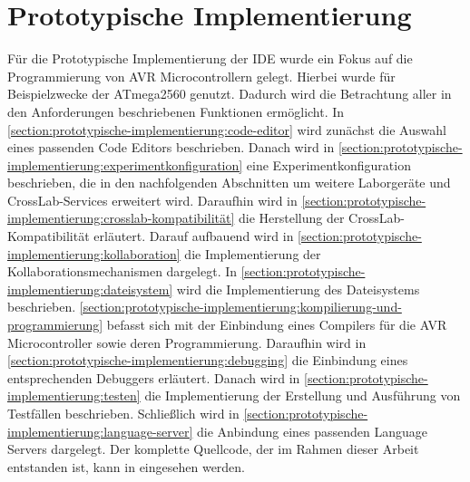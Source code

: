 \chapter{Prototypische Implementierung}\label{section:prototypische-implementierung}

Für die Prototypische Implementierung der IDE wurde ein Fokus auf die Programmierung von AVR Microcontrollern \cite{noauthor_avr_nodate} gelegt. Hierbei wurde für Beispielzwecke der ATmega2560 \cite{noauthor_atmega2560_nodate} genutzt. Dadurch wird die Betrachtung aller in den Anforderungen beschriebenen Funktionen ermöglicht. In \autoref{section:prototypische-implementierung:code-editor} wird zunächst die Auswahl eines passenden Code Editors beschrieben. Danach wird in \autoref{section:prototypische-implementierung:experimentkonfiguration} eine Experimentkonfiguration beschrieben, die in den nachfolgenden Abschnitten um weitere Laborgeräte und CrossLab-Services erweitert wird. Daraufhin wird in \autoref{section:prototypische-implementierung:crosslab-kompatibilität} die Herstellung der CrossLab-Kompatibilität erläutert. Darauf aufbauend wird in \autoref{section:prototypische-implementierung:kollaboration} die Implementierung der Kollaborationsmechanismen dargelegt. In \autoref{section:prototypische-implementierung:dateisystem} wird die Implementierung des Dateisystems beschrieben. \autoref{section:prototypische-implementierung:kompilierung-und-programmierung} befasst sich mit der Einbindung eines Compilers für die AVR Microcontroller sowie deren Programmierung. Daraufhin wird in \autoref{section:prototypische-implementierung:debugging} die Einbindung eines entsprechenden Debuggers erläutert. Danach wird in \autoref{section:prototypische-implementierung:testen} die Implementierung der Erstellung und Ausführung von Testfällen beschrieben. Schließlich wird in \autoref{section:prototypische-implementierung:language-server} die Anbindung eines passenden Language Servers dargelegt. Der komplette Quellcode, der im Rahmen dieser Arbeit entstanden ist, kann in \cite{lassertos_lassertosmasterarbeit_2025} eingesehen werden.









